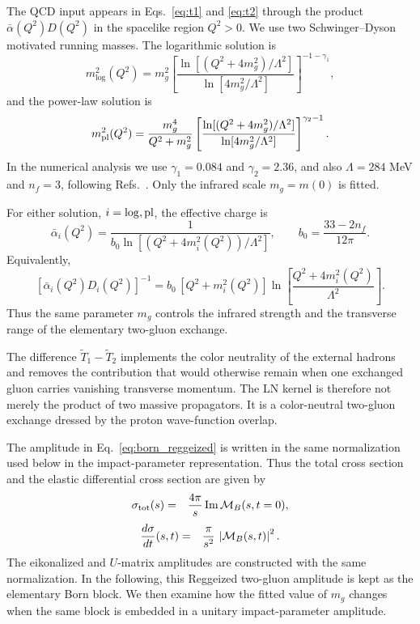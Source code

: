 \documentclass[aps,prd,twocolumn,superscriptaddress,longbibliography,nofootinbib]{revtex4-2}
\begin{document}
The QCD input appears in Eqs.~\eqref{eq:t1} and \eqref{eq:t2} through the product $\bar\alpha(Q^2)D(Q^2)$ in the spacelike region $Q^2>0$.  We use two Schwinger--Dyson motivated running masses.  The logarithmic solution is
\begin{equation}
m_{\log}^2(Q^2)
=
m_g^2
\left[
\frac{\ln[(Q^2+4m_g^2)/\Lambda^2]}{\ln[4m_g^2/\Lambda^2]}
\right]^{-1-\gamma_1},
\label{eq:mlog}
\end{equation}
and the power-law solution is
\begin{equation}
m_{\rm pl}^2(Q^2)
=
\frac{m_g^4}{Q^2+m_g^2}
\left[
\frac{\ln[(Q^2+4m_g^2)/\Lambda^2]}{\ln[4m_g^2/\Lambda^2]}
\right]^{\gamma_2-1}.
\label{eq:mpl}
\end{equation}
In the numerical analysis we use $\gamma_1=0.084$ and $\gamma_2=2.36$, and also $\Lambda=284$ MeV and $n_f=3$, following Refs.~\cite{AguilarPapavassiliou2008,LunaNataleDosSantos2011,BopsinEtAl2023}.  Only the infrared scale $m_g=m(0)$ is fitted.

For either solution, $i=\log,{\rm pl}$, the effective charge is
\begin{equation}
\bar\alpha_i(Q^2)
=
\frac{1}{b_0\ln[(Q^2+4m_i^2(Q^2))/\Lambda^2]},
\qquad
b_0=\frac{33-2n_f}{12\pi}.
\label{eq:effective_charge}
\end{equation}
Equivalently,
\begin{equation}
\left[\bar\alpha_i(Q^2)D_i(Q^2)\right]^{-1}
=
b_0\,[Q^2+m_i^2(Q^2)]
\ln\left[\frac{Q^2+4m_i^2(Q^2)}{\Lambda^2}\right].
\label{eq:alphaD}
\end{equation}
Thus the same parameter $m_g$ controls the infrared strength and the transverse range of the elementary two-gluon exchange.

The difference $\widetilde T_1-\widetilde T_2$ implements the color neutrality of the external hadrons and removes the contribution that would otherwise remain when one exchanged gluon carries vanishing transverse momentum.  The LN kernel is therefore not merely the product of two massive propagators.  It is a color-neutral two-gluon exchange dressed by the proton wave-function overlap.

The amplitude in Eq.~\eqref{eq:born_reggeized} is written in the same normalization used below in the impact-parameter representation.  Thus the total cross section and the elastic differential cross section are given by
\begin{eqnarray}
\sigma_{\rm tot}(s)
&=&
\frac{4\pi}{s}\,
\mbox{Im}\,{\cal M}_B(s,t=0),
\label{eq:sigtot_born}
\end{eqnarray}
\begin{eqnarray}
\frac{d\sigma}{dt}(s,t)
&=&
\frac{\pi}{s^2}\,
\left|{\cal M}_B(s,t)\right|^2 .
\label{eq:dsdt_born}
\end{eqnarray}
The eikonalized and $U$-matrix amplitudes are constructed with the same normalization.  In the following, this Reggeized two-gluon amplitude is kept as the elementary Born block.  We then examine how the fitted value of $m_g$ changes when the same block is embedded in a unitary impact-parameter amplitude.
\end{document}
